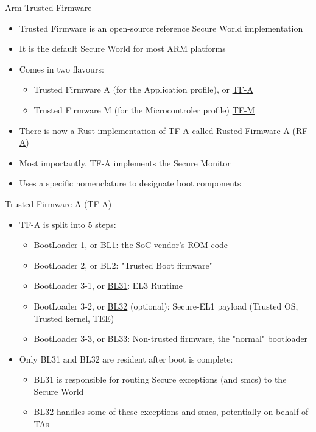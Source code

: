 \begin{frame}{\href{https://www.trustedfirmware.org/}{Arm Trusted Firmware}}
  \begin{itemize}
    \item Trusted Firmware is an open-source reference Secure World implementation
    \item It is the default Secure World for most ARM platforms
    \item Comes in two flavours:
    \begin{itemize}
      \item Trusted Firmware A (for the Application profile), or
            \href{https://www.trustedfirmware.org/projects/tf-a}{TF-A}
      \item Trusted Firmware M (for the Microcontroler profile)
            \href{https://www.trustedfirmware.org/projects/tf-m}{TF-M}
    \end{itemize}
    \item There is now a Rust implementation of TF-A called Rusted Firmware A
          (\href{https://www.trustedfirmware.org/projects/rf-a}{RF-A})
    \item Most importantly, TF-A implements the Secure Monitor
    \item Uses a specific nomenclature to designate boot components
  \end{itemize}
\end{frame}

\begin{frame}{Trusted Firmware A (TF-A)}
  \begin{itemize}
    \item TF-A is split into 5 steps:
    \begin{itemize}
      \item BootLoader 1, or BL1: the SoC vendor's ROM code
      \item BootLoader 2, or BL2: "Trusted Boot firmware"
      \item BootLoader 3-1, or \href{https://elixir.bootlin.com/arm-trusted-firmware/v2.14.0/source/bl31}{BL31}:
            EL3 Runtime
      \item BootLoader 3-2, or \href{https://elixir.bootlin.com/arm-trusted-firmware/v2.14.0/source/bl32}{BL32} (optional):
            Secure-EL1 payload (Trusted OS, Trusted kernel, TEE)
      \item BootLoader 3-3, or BL33: Non-trusted firmware, the "normal" bootloader
    \end{itemize}
    \item Only BL31 and BL32 are resident after boot is complete:
    \begin{itemize}
      \item BL31 is responsible for routing Secure exceptions (and smcs) to the Secure World
      \item BL32 handles some of these exceptions and smcs, potentially on behalf of TAs
    \end{itemize}
  \end{itemize}
\end{frame}

